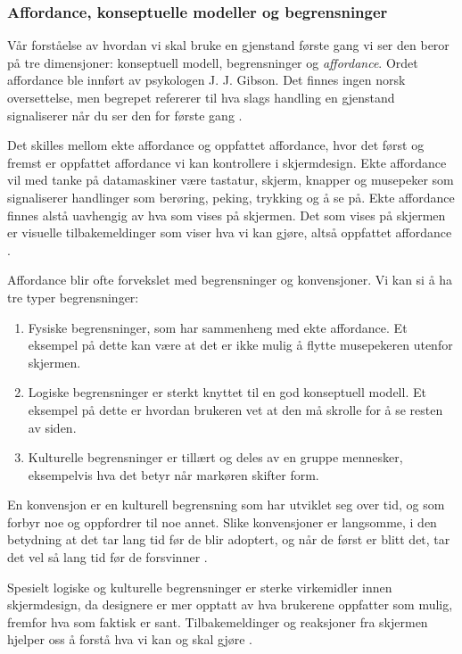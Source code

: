 \subsubsection{Affordance, konseptuelle modeller og begrensninger}
Vår forståelse av hvordan vi skal bruke en gjenstand første gang vi ser den beror på tre dimensjoner: konseptuell modell, begrensninger og \emph{affordance}. Ordet affordance ble innført av psykologen J. J. Gibson. Det finnes ingen norsk oversettelse, men begrepet refererer til hva slags handling en gjenstand signaliserer når du ser den for første gang \cite{Norman99}.

\noindent
Det skilles mellom ekte affordance og oppfattet affordance, hvor det først og fremst er oppfattet affordance vi kan kontrollere i skjermdesign. Ekte affordance vil med tanke på datamaskiner være tastatur, skjerm, knapper og musepeker som signaliserer handlinger som berøring, peking, trykking og å se på. Ekte affordance finnes alstå uavhengig av hva som vises på skjermen. Det som vises på skjermen er visuelle tilbakemeldinger som viser hva vi kan gjøre, altså oppfattet affordance \cite{Norman99}.

\noindent
Affordance blir ofte forvekslet med begrensninger og konvensjoner. Vi kan si å ha tre typer begrensninger:
\begin{enumerate}
\item Fysiske begrensninger, som har sammenheng med ekte affordance. Et eksempel på dette kan være at det er ikke mulig å flytte musepekeren utenfor skjermen. 
\item Logiske begrensninger er sterkt knyttet til en god konseptuell modell. Et eksempel på dette er hvordan brukeren vet at den må skrolle for å se resten av siden.
\item Kulturelle begrensninger er tillært og deles av en gruppe mennesker, eksempelvis hva det betyr når markøren skifter form.
\end{enumerate}
En konvensjon er en kulturell begrensning som har utviklet seg over tid, og som forbyr noe og oppfordrer til noe annet. Slike konvensjoner er langsomme, i den betydning at det tar lang tid før de blir adoptert, og når de først er blitt det, tar det vel så lang tid før de forsvinner \cite{Norman99}.

\noindent
Spesielt logiske og kulturelle begrensninger er sterke virkemidler innen skjermdesign, da designere er mer opptatt av hva brukerene oppfatter som mulig, fremfor hva som faktisk er sant. Tilbakemeldinger og reaksjoner fra skjermen hjelper oss å forstå hva vi kan og skal gjøre \cite{Norman99}.